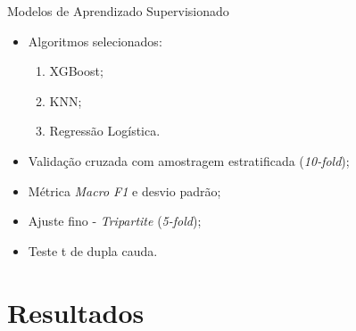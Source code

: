 \documentclass{beamer}
\begin{document}
\begin{frame}{Modelos de Aprendizado Supervisionado}
    
    \begin{itemize}
        \setlength{\itemsep}{10pt}
        \item Algoritmos selecionados:
        \begin{enumerate}
            \vspace{0.2cm}
            \setlength{\itemsep}{10pt}
            \item XGBoost;
            \item KNN;
            \item Regressão Logística.
        \end{enumerate}
        \item Validação cruzada com amostragem estratificada (\emph{10-fold});
        \item Métrica \emph{Macro F1} e desvio padrão;
        \item Ajuste fino - \emph{Tripartite} (\emph{5-fold});
        \item Teste t de dupla cauda.
    \end{itemize}
    
\end{frame}

\section{Resultados}
\end{document}
